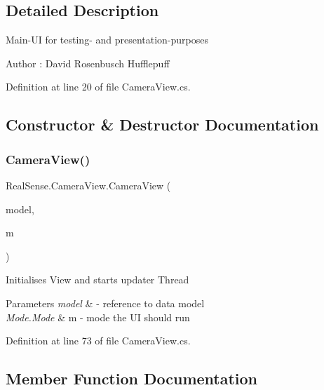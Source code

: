 \subsection{Detailed Description}
Main-\/\+UI for testing-\/ and presentation-\/purposes \begin{DoxyAuthor}{Author}
\+: David Rosenbusch  Hufflepuff 
\end{DoxyAuthor}


Definition at line 20 of file Camera\+View.\+cs.



\subsection{Constructor \& Destructor Documentation}
\mbox{\label{class_real_sense_1_1_camera_view_ac7f93adbed37d386412a051e6f93f978}} 
\subsubsection{\texorpdfstring{Camera\+View()}{CameraView()}}
{\footnotesize\ttfamily Real\+Sense.\+Camera\+View.\+Camera\+View (\begin{DoxyParamCaption}\item[{\hyperlink{class_real_sense_1_1_model}{Model}}]{model,  }\item[{\hyperlink{class_real_sense_1_1_model_ace9541c050b75cb23582ce01ac892190}{Model.\+M\+O\+DE}}]{m }\end{DoxyParamCaption})}

Initialises View and starts updater Thread 
\begin{DoxyParams}{Parameters}
{\em model} & -\/ reference to data model \\
\hline
{\em Mode.\+Mode} & m -\/ mode the UI should run \\
\hline
\end{DoxyParams}


Definition at line 73 of file Camera\+View.\+cs.



\subsection{Member Function Documentation}
\mbox{\label{class_real_sense_1_1_camera_view_a67c8ee2cdbf0caf43e48043d90c0d549}} 
